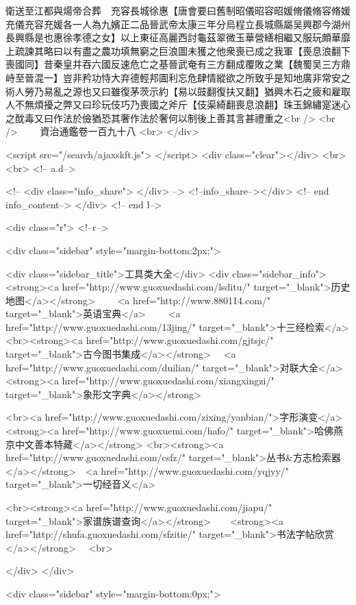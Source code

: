 衛送至江都與煬帝合葬　充容長城徐惠【唐會要曰舊制昭儀昭容昭媛脩儀脩容脩媛充儀充容充媛各一人為九嬪正二品晉武帝太康三年分烏程立長城縣屬吴興郡今湖州長興縣是也惠徐孝德之女】以上東征高麗西討龜茲翠微玉華營繕相繼又服玩頗華靡上疏諫其略曰以有盡之農功填無窮之巨浪圖未獲之他衆喪已成之我軍【喪息浪翻下喪國同】昔秦皇并吞六國反速危亡之基晉武奄有三方翻成覆敗之業【魏蜀吴三方鼎峙至晉混一】豈非矜功恃大弃德輕邦圖利忘危肆情縱欲之所致乎是知地廣非常安之術人勞乃易亂之源也又曰雖復茅茨示約【易以豉翻復扶又翻】猶興木石之疲和雇取人不無煩擾之弊又曰珍玩伎巧乃喪國之斧斤【伎渠綺翻喪息浪翻】珠玉錦繡寔迷心之酖毒又曰作法於儉猶恐其奢作法於奢何以制後上善其言甚禮重之<br />
<br />
　　資治通鑑卷一百九十八  <br>
   </div> 

<script src="/search/ajaxskft.js"> </script>
 <div class="clear"></div>
<br>
<br>
 <!-- a.d-->

 <!--
<div class="info_share">
</div> 
-->
 <!--info_share--></div>   <!-- end info_content-->
  </div> <!-- end l-->

<div class="r">   <!--r-->



<div class="sidebar"  style="margin-bottom:2px;">

 
<div class="sidebar_title">工具类大全</div>
<div class="sidebar_info">
<strong><a href="http://www.guoxuedashi.com/lsditu/" target="_blank">历史地图</a></strong>　　
<a href="http://www.880114.com/" target="_blank">英语宝典</a>　　
<a href="http://www.guoxuedashi.com/13jing/" target="_blank">十三经检索</a>　
<br><strong><a href="http://www.guoxuedashi.com/gjtsjc/" target="_blank">古今图书集成</a></strong>　
<a href="http://www.guoxuedashi.com/duilian/" target="_blank">对联大全</a>　<strong><a href="http://www.guoxuedashi.com/xiangxingzi/" target="_blank">象形文字典</a></strong>　

<br><a href="http://www.guoxuedashi.com/zixing/yanbian/">字形演变</a>　　<strong><a href="http://www.guoxuemi.com/hafo/" target="_blank">哈佛燕京中文善本特藏</a></strong>
<br><strong><a href="http://www.guoxuedashi.com/csfz/" target="_blank">丛书&方志检索器</a></strong>　<a href="http://www.guoxuedashi.com/yqjyy/" target="_blank">一切经音义</a>　　

<br><strong><a href="http://www.guoxuedashi.com/jiapu/" target="_blank">家谱族谱查询</a></strong>　　<strong><a href="http://shufa.guoxuedashi.com/sfzitie/" target="_blank">书法字帖欣赏</a></strong>　
<br>

</div>
</div>


<div class="sidebar" style="margin-bottom:0px;">

